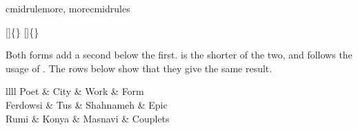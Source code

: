 \begin{codedescribe}[
        code,
        new=2021N
    ]{cmidrulemore, morecmidrules}
    \begin{codesyntax}
        []\{\}
         []\{\}
    \end{codesyntax}
    Both forms add a second  below the first.  is the shorter of the two, and  follows the usage of . The rows below show that they give the same result.

    \begin{codestore}[st=lib:booktabs:more]
        \begin{tblr}{llll}
            \toprule
            Poet     & City  & Work      & Form     \\
             
            Ferdowsi & Tus   & Shahnameh & Epic     \\
             \morecmidrules {}
            Rumi     & Konya & Masnavi   & Couplets \\
            \bottomrule
        \end{tblr}\end{codestore}
    \begin{center}
    \end{center}
\end{codedescribe}

